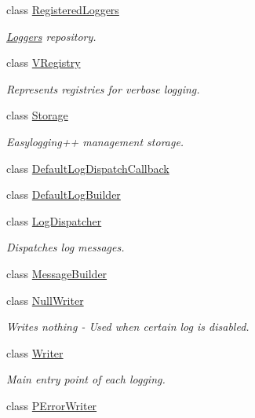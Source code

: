 \begin{DoxyCompactItemize}
class \hyperlink{classel_1_1base_1_1RegisteredLoggers}{Registered\-Loggers}
\begin{DoxyCompactList}\small\item\em \hyperlink{classel_1_1Loggers}{Loggers} repository. \end{DoxyCompactList}\item 
class \hyperlink{classel_1_1base_1_1VRegistry}{V\-Registry}
\begin{DoxyCompactList}\small\item\em Represents registries for verbose logging. \end{DoxyCompactList}\item 
class \hyperlink{classel_1_1base_1_1Storage}{Storage}
\begin{DoxyCompactList}\small\item\em Easylogging++ management storage. \end{DoxyCompactList}\item 
class \hyperlink{classel_1_1base_1_1DefaultLogDispatchCallback}{Default\-Log\-Dispatch\-Callback}
\item 
class \hyperlink{classel_1_1base_1_1DefaultLogBuilder}{Default\-Log\-Builder}
\item 
class \hyperlink{classel_1_1base_1_1LogDispatcher}{Log\-Dispatcher}
\begin{DoxyCompactList}\small\item\em Dispatches log messages. \end{DoxyCompactList}\item 
class \hyperlink{classel_1_1base_1_1MessageBuilder}{Message\-Builder}
\item 
class \hyperlink{classel_1_1base_1_1NullWriter}{Null\-Writer}
\begin{DoxyCompactList}\small\item\em Writes nothing -\/ Used when certain log is disabled. \end{DoxyCompactList}\item 
class \hyperlink{classel_1_1base_1_1Writer}{Writer}
\begin{DoxyCompactList}\small\item\em Main entry point of each logging. \end{DoxyCompactList}\item 
class \hyperlink{classel_1_1base_1_1PErrorWriter}{P\-Error\-Writer}
\end{DoxyCompactItemize}
